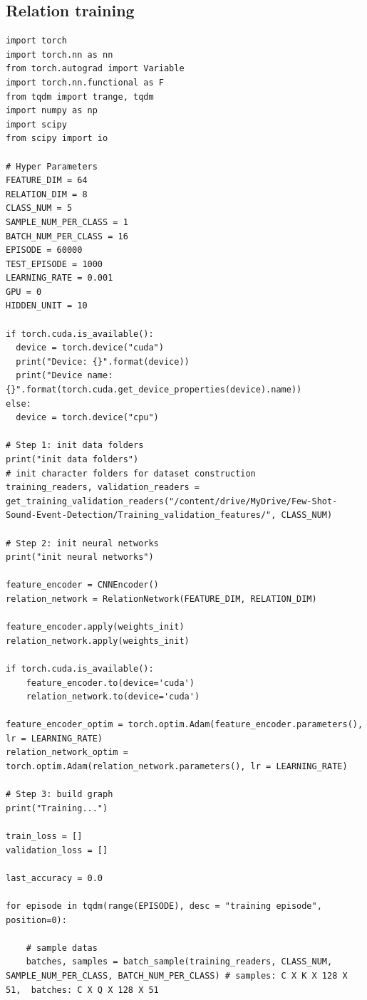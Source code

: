 \documentclass[12pt,a4paper,titlepage]{article}
\begin{document}
\subsection{Relation training}
\begin{lstlisting}[language=iPython,firstnumber=1, caption=relation\_training.py, label=relation training,captionpos=b]
import torch
import torch.nn as nn
from torch.autograd import Variable
import torch.nn.functional as F
from tqdm import trange, tqdm
import numpy as np
import scipy
from scipy import io

# Hyper Parameters
FEATURE_DIM = 64
RELATION_DIM = 8
CLASS_NUM = 5
SAMPLE_NUM_PER_CLASS = 1
BATCH_NUM_PER_CLASS = 16
EPISODE = 60000
TEST_EPISODE = 1000
LEARNING_RATE = 0.001
GPU = 0
HIDDEN_UNIT = 10

if torch.cuda.is_available():
  device = torch.device("cuda")
  print("Device: {}".format(device))
  print("Device name: {}".format(torch.cuda.get_device_properties(device).name))
else:
  device = torch.device("cpu")

# Step 1: init data folders
print("init data folders")
# init character folders for dataset construction
training_readers, validation_readers = get_training_validation_readers("/content/drive/MyDrive/Few-Shot-Sound-Event-Detection/Training_validation_features/", CLASS_NUM)

# Step 2: init neural networks
print("init neural networks")

feature_encoder = CNNEncoder()
relation_network = RelationNetwork(FEATURE_DIM, RELATION_DIM)

feature_encoder.apply(weights_init)
relation_network.apply(weights_init)

if torch.cuda.is_available():
    feature_encoder.to(device='cuda')
    relation_network.to(device='cuda')

feature_encoder_optim = torch.optim.Adam(feature_encoder.parameters(), lr = LEARNING_RATE)
relation_network_optim = torch.optim.Adam(relation_network.parameters(), lr = LEARNING_RATE)

# Step 3: build graph
print("Training...")

train_loss = []
validation_loss = []

last_accuracy = 0.0

for episode in tqdm(range(EPISODE), desc = "training episode", position=0):

    # sample datas
    batches, samples = batch_sample(training_readers, CLASS_NUM, SAMPLE_NUM_PER_CLASS, BATCH_NUM_PER_CLASS) # samples: C X K X 128 X 51,  batches: C X Q X 128 X 51
    

\end{lstlisting}
\end{document}
